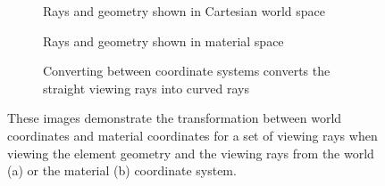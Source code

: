 \begin{figure}
\centering
\begin{subfigure}[b]{0.3\linewidth}
    \caption{Rays and geometry shown in Cartesian world space}
    \label{contribution:medbio:fem:rays:world}
\end{subfigure}
\hfill
\begin{subfigure}[b]{0.3\linewidth}
    \caption{Rays and geometry shown in material space}
    \label{contribution:medbio:fem:rays:xi}
\end{subfigure}
\hfill
\begin{subfigure}[b]{0.3\linewidth}
   \caption{Converting between coordinate systems converts the straight viewing rays into curved rays}
   \label{contribution:medbio:fem:rays:rays}
\end{subfigure}
\caption{These images demonstrate the transformation between world coordinates and material coordinates for a set of viewing rays when viewing the element geometry and the viewing rays from the world (a) or the material (b) coordinate system.}
\label{contribution:medbio:fem:rays}
\end{figure}

